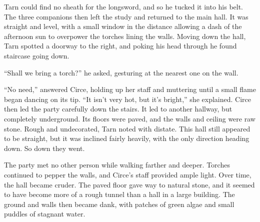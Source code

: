Tarn could find no sheath for the longsword, and so he tucked it into his belt.  The three companions then left the study and returned to the main hall.  It was straight and level, with a small window in the distance allowing a dash of the afternoon sun to overpower the torches lining the walls.  Moving down the hall, Tarn spotted a doorway to the right, and poking his head through he found staircase going down.

``Shall we bring a torch?'' he asked, gesturing at the nearest one on the wall.

``No need,'' answered Circe, holding up her staff and muttering until a small flame began dancing on its tip.  ``It isn't very hot, but it's bright,'' she explained.  Circe then led the party carefully down the stairs.  It led to another hallway, but completely underground.  Its floors were paved, and the walls and ceiling were raw stone.  Rough and undecorated, Tarn noted with distate.  This hall still appeared to be straight, but it was inclined fairly heavily, with the only direction heading down.  So down they went.

The party met no other person while walking farther and deeper.  Torches continued to pepper the walls, and Circe's staff provided ample light.  Over time, the hall became cruder.  The paved floor gave way to natural stone, and it seemed to have become more of a rough tunnel than a hall in a large building.  The ground and walls then became dank, with patches of green algae and small puddles of stagnant water.